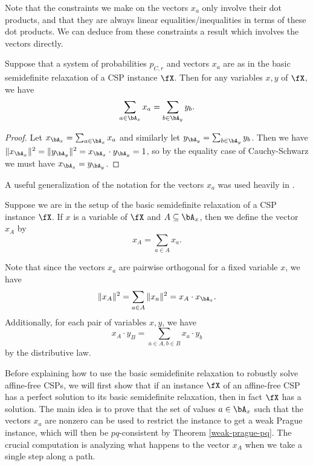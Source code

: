 Note that the constraints we make on the vectors $x_a$ only involve their dot products, and that they are always linear equalities/inequalities in terms of these dot products. We can deduce from these constraints a result which involves the vectors directly.

\begin{prop} Suppose that a system of probabilities $p_{C,r}$ and vectors $x_a$ are as in the basic semidefinite relaxation of a CSP instance $\fX$. Then for any variables $x,y$ of $\fX$, we have
\[
\sum_{a \in \bA_x} x_a = \sum_{b \in \bA_y} y_b.
\]
\end{prop}
\begin{proof} Let $x_{\bA_x} = \sum_{a \in \bA_x} x_a$ and similarly let $y_{\bA_y} = \sum_{b \in \bA_y} y_b$. Then we have $\|x_{\bA_x}\|^2 = \|y_{\bA_y}\|^2 = x_{\bA_x}\cdot y_{\bA_y} = 1$, so by the equality case of Cauchy-Schwarz we must have $x_{\bA_x} = y_{\bA_y}$.
\end{proof}

A useful generalization of the notation for the vectors $x_a$ was used heavily in \cite{sdp}.

\begin{defn} Suppose we are in the setup of the basic semidefinite relaxation of a CSP instance $\fX$. If $x$ is a variable of $\fX$ and $A \subseteq \bA_x$, then we define the vector $x_A$ by
\[
x_A = \sum_{a \in A} x_a.
\]
\end{defn}

Note that since the vectors $x_a$ are pairwise orthogonal for a fixed variable $x$, we have
\[
\|x_A\|^2 = \sum_{a \in A} \|x_a\|^2 = x_A \cdot x_{\bA_x}.
\]
Additionally, for each pair of variables $x,y$, we have
\[
x_A \cdot y_B = \sum_{a \in A, b \in B} x_a\cdot y_b
\]
by the distributive law.

Before explaining how to use the basic semidefinite relaxation to robustly solve affine-free CSPs, we will first show that if an instance $\fX$ of an affine-free CSP has a perfect solution to its basic semidefinite relaxation, then in fact $\fX$ has a solution. The main idea is to prove that the set of values $a \in \bA_x$ such that the vectors $x_a$ are nonzero can be used to restrict the instance to get a weak Prague instance, which will then be $pq$-consistent by Theorem \ref{weak-prague-pq}. The crucial computation is analyzing what happens to the vector $x_A$ when we take a single step along a path.

